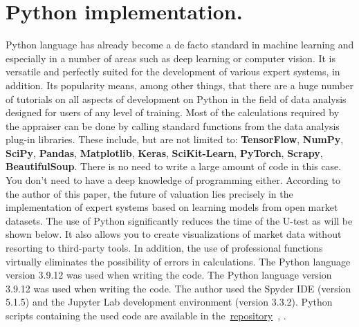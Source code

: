 \documentclass[]{scrreprt}
\begin{document}
\section{Python implementation.}\label{U-test-Python}
%
%
Python language has already become a de facto standard in machine learning and especially in a number of areas such as deep learning or computer vision. It is versatile and perfectly suited for the development of various expert systems, in addition. Its popularity means, among other things, that there are a huge number of tutorials on all aspects of development on Python in the field of data analysis designed for users of any level of training. Most of the calculations required by the appraiser can be done by calling standard functions from the data analysis plug-in libraries. These include, but are not limited to: \textbf{TensorFlow}, \textbf{NumPy}, \textbf{SciPy}, \textbf{Pandas}, \textbf{Matplotlib}, \textbf{Keras}, \textbf{SciKit-Learn}, \textbf{PyTorch}, \textbf{Scrapy}, \textbf{BeautifulSoup}. There is no need to write a large amount of code in this case. You don't need to have a deep knowledge of programming either. According to the author of this paper, the future of valuation lies precisely in the implementation of expert systems based on learning models from open market datasets. The use of Python significantly reduces the time of the U-test as will be shown below. It also allows you to create visualizations of market data without resorting to third-party tools. In addition, the use of professional functions virtually eliminates the possibility of errors in calculations. The Python language version 3.9.12 was used when writing the code. The Python language version 3.9.12 was used when writing the code. The author used the Spyder IDE (version 5.1.5) and the Jupyter Lab development environment (version 3.3.2). Python scripts containing the used code are available in the~\href{https://github.com/Kirill-Murashev/AI_for_valuers_Python_source/tree/main/Mann-Whitney-u-test}{repository}~\cite{Murashev:U-test.py}, \cite{Murashev:U-test.ipynb}.
\end{document}
